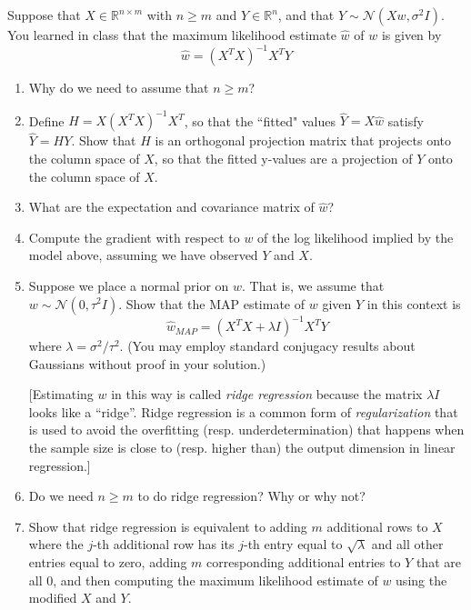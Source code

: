 \documentclass[submit]{harvardml}
\newcommand{\R}{\mathbb{R}}
\newcommand{\N}{\mathcal{N}}
\begin{document}
\pagebreak
\begin{problem}
Suppose that $X \in \R^{n \times m}$ with $n \geq m$ and $Y \in \R^n$, and that $Y \sim \N(Xw, \sigma^2 I)$. You learned in class that the maximum likelihood estimate $\hat{w}$ of ${w}$ is given by
\[
\hat{w} = (X^TX)^{-1}X^TY
\]
\begin{enumerate}[label=(\alph*)]
\item Why do we need to assume that $n \geq m$?
\item Define $H = X(X^TX)^{-1}X^T$, so that the ``fitted" values $\hat Y = X\hat{{w}}$ satisfy $\hat Y = HY$. Show that $H$ is an orthogonal projection matrix that projects onto the column space of $X$, so that the fitted y-values are a projection of $Y$ onto the column space of $X$.
\item What are the expectation and covariance matrix of $\hat{w}$?
\item Compute the gradient with respect to ${w}$ of the log likelihood implied by the model above, assuming we have observed $Y$ and $X$.
\item Suppose we place a normal prior on ${w}$. That is, we assume that ${w} \sim \N(0, \tau^2 I)$. Show that the MAP estimate of ${w}$ given $Y$ in this context is
\[
\hat {w}_{MAP} = (X^TX + \lambda I)^{-1}X^T Y
\]
where $\lambda = \sigma^2 / \tau^2$. (You may employ standard conjugacy results about Gaussians without proof in your solution.)

[Estimating ${w}$ in this way is called {\em ridge regression} because the matrix $\lambda I$ looks like a ``ridge''. Ridge regression is a common form of {\em regularization} that is used to avoid the overfitting (resp. underdetermination) that happens when the sample size is close to (resp. higher than) the output dimension in linear regression.]
\item Do we need $n \geq m$ to do ridge regression? Why or why not?
\item Show that ridge regression is equivalent to adding $m$ additional rows to $X$ where the $j$-th additional row has its $j$-th entry equal to $\sqrt{\lambda}$ and all other entries equal to zero, adding $m$ corresponding additional entries to $Y$ that are all 0, and then computing the maximum likelihood estimate of ${w}$ using the modified $X$ and $Y$.
\end{enumerate}
\vspace{0.1cm}
\end{problem}
\end{document}
